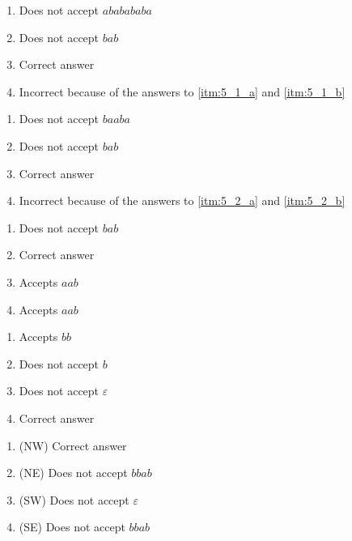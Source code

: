 \documentclass[docid=2012]{tcom_test1}
\begin{document}
\setcounter{subsection}{4}
\begin{enumerate}[label=(\alph*)]
	\item \label{itm:5_1_a} Does not accept $ababababa$
	\item \label{itm:5_1_b} Does not accept $bab$
	\item \label{itm:5_1_correct} Correct answer
	\item Incorrect because of the answers to \ref{itm:5_1_a} and \ref{itm:5_1_b} 
\end{enumerate}
\begin{enumerate}[label=(\alph*)]
	\item \label{itm:5_2_a} Does not accept $baaba$
	\item \label{itm:5_2_b} Does not accept $bab$
	\item \label{itm:5_2_correct} Correct answer
	\item Incorrect because of the answers to \ref{itm:5_2_a} and \ref{itm:5_2_b} 
\end{enumerate}
\begin{enumerate}[label=(\alph*)]
	\item Does not accept $bab$
	\item \label{itm:5_3_correct} Correct answer
	\item Accepts $aab$
	\item Accepts $aab$
\end{enumerate}
\setcounter{subsection}{5}
\setcounter{subsubsection}{4}
\begin{enumerate}[label=(\alph*)]
	\item Accepts $bb$
	\item Does not accept $b$
	\item Does not accept $\varepsilon$
	\item \label{itm:6_5_correct} Correct answer
\end{enumerate}
\begin{enumerate}[label=(\alph*)]
	\item \label{itm:7_1_correct} (NW) Correct answer
	\item (NE) Does not accept $bbab$
	\item (SW) Does not accept $\varepsilon$
	\item (SE) Does not accept $bbab$
\end{enumerate}
\end{document}
